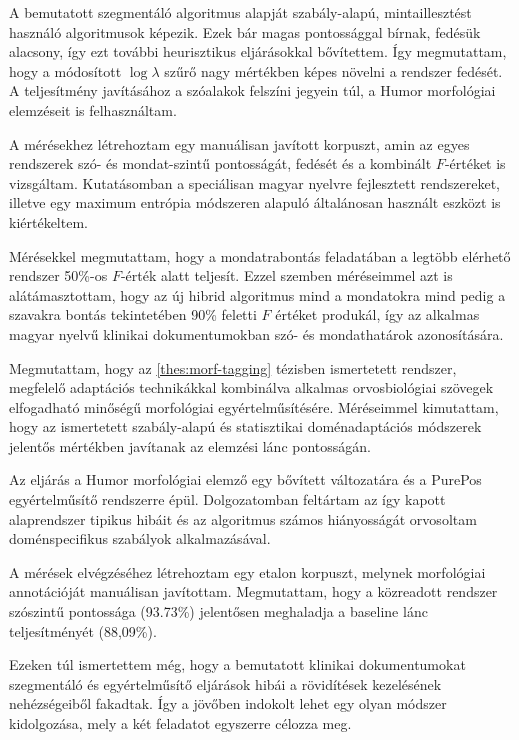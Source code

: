 A bemutatott szegmentáló algoritmus alapját szabály-alapú, mintaillesztést használó algoritmusok képezik. 
Ezek bár magas pontossággal bírnak, fedésük alacsony, így ezt további heurisztikus eljárásokkal bővítettem.
Így megmutattam, hogy a módosított $\log \lambda$ szűrő nagy mértékben képes növelni a rendszer fedését. 
A teljesítmény javításához a szóalakok felszíni jegyein túl, a Humor morfológiai elemzéseit is felhasználtam.

A mérésekhez létrehoztam egy manuálisan javított korpuszt, amin az egyes rendszerek szó- és mondat-szintű pontosságát, fedését és a kombinált $F$-értéket is vizsgáltam.  
Kutatásomban a speciálisan magyar nyelvre fejlesztett rendszereket, illetve egy maximum entrópia módszeren alapuló általánosan használt eszközt is kiértékeltem.

Mérésekkel megmutattam, hogy a mondatrabontás feladatában a legtöbb elérhető rendszer 50\%-os $F$-érték alatt teljesít. 
Ezzel szemben méréseimmel azt is alátámasztottam, hogy az új hibrid algoritmus mind a mondatokra mind pedig a szavakra bontás tekintetében 90\% feletti $F$ értéket produkál, így az alkalmas 
magyar nyelvű klinikai dokumentumokban szó- és mondathatárok azonosítására.

\thesisline%

\begin{core}
\begin{thesis}%
\label{thes:clin-pos}
Megmutattam, hogy az \ref{thes:morf-tagging} tézisben ismertetett rendszer, megfelelő adaptációs technikákkal kombinálva alkalmas orvosbiológiai szövegek elfogadható minőségű morfológiai egyértelműsítésére. 
Méréseimmel kimutattam, hogy az ismertetett szabály-alapú és statisztikai doménadaptációs módszerek jelentős mértékben javítanak az elemzési lánc pontosságán.
\end{thesis}

\begin{pub}
\cite{Orosz2013,Orosz2014b} 
\end{pub}
\end{core}

Az eljárás a Humor morfológiai elemző egy bővített változatára és a PurePos egyértelműsítő rendszerre épül. 
Dolgozatomban feltártam az így kapott alaprendszer tipikus hibáit és az algoritmus számos hiányosságát orvosoltam doménspecifikus szabályok alkalmazásával. 

A mérések elvégzéséhez létrehoztam egy etalon korpuszt, melynek morfológiai annotációját manuálisan javítottam. 
Megmutattam, hogy a közreadott rendszer szószintű pontossága (93.73\%) jelentősen meghaladja a baseline lánc teljesítményét (88,09\%). 

Ezeken túl ismertettem még, hogy a bemutatott klinikai dokumentumokat szegmentáló és egyértelműsítő eljárások hibái a rövidítések kezelésének nehézségeiből fakadtak.
Így a jövőben indokolt lehet egy olyan módszer kidolgozása, mely a két feladatot egyszerre célozza meg.

\let\thesubsection=\oldthesubsection
